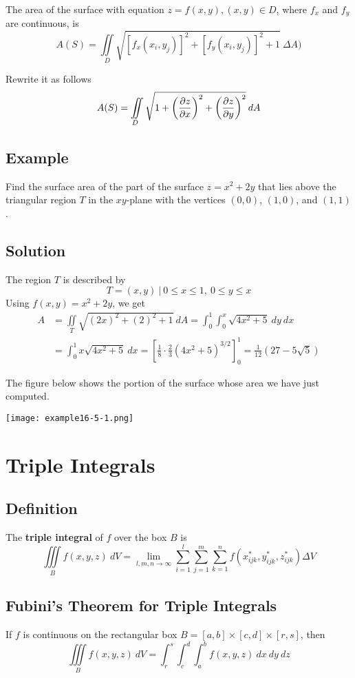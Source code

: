 The area of the surface with equation $z=f(x, y), (x, y)\in D$,
where $f_x$ and $f_y$ are continuous, is
$$A(S)=\iint\limits_D\sqrt{[f_x(x_i,y_j)]^2+[f_y(x_i,y_j)]^2+1}\:\Delta A)$$

Rewrite it as follows
$$A(S)=\iint\limits_D\sqrt{1+\left(\pdv{z}{x}\right)^2+\left(\pdv{z}{y}\right)^2}\:dA$$

\subsection*{Example}
Find the surface area of the part of the surface $z=x^2+2y$ that lies above the triangular
region $T$ in the $xy$-plane with the vertices $(0,0)$, $(1,0)$, and $(1,1)$.

\subsection*{Solution}
The region $T$ is described by
$$T={(x,y)\:|\:0\leq x\leq 1,\: 0\leq y\leq x}$$
Using $f(x,y)=x^2+2y$, we get
\begin{align*}
    A & =\iint\limits_T \sqrt{(2x)^2+(2)^2+1}\:dA=\int_0^1\int_0^x\sqrt{4x^2+5}\:dy\:dx                                    \\
      & =\int_0^1 x\sqrt{4x^2+5}\:dx=\left[\frac{1}{8}\cdot\frac{2}{3}(4x^2+5)^{3/2}\right]_0^1=\frac{1}{12}(27-5\sqrt{5})
\end{align*}

The figure below shows the portion of the surface whose area we have just computed.
\begin{center}
    \texttt{[image: example16-5-1.png]}
\end{center}

\section{Triple Integrals}

\subsection*{Definition}
The \textbf{triple integral} of $f$ over the box $B$ is
$$\iiint\limits_B f(x,y,z)\:dV=\lim_{l,m,n\to\infty}\sum_{i=1}^l\sum_{j=1}^m\sum_{k=1}^n
    f(x_{ijk}^*,y_{ijk}^*,z_{ijk}^*)\Delta V$$

\subsection*{Fubini's Theorem for Triple Integrals}
If $f$ is continuous on the rectangular box $B=[a,b]\times[c,d]\times[r,s]$, then
$$\iiint\limits_B f(x,y,z)\:dV=\int_r^s\int_c^d\int_a^b f(x,y,z)\:dx\:dy\:dz$$

